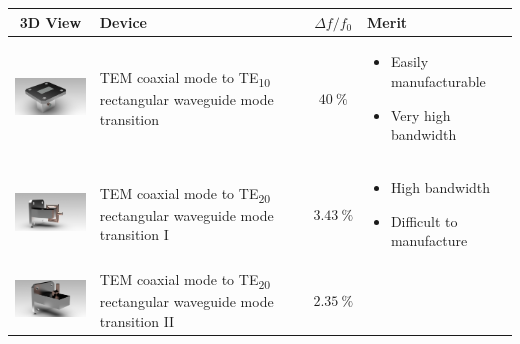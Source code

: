 \documentclass[english,twoside]{article}
\newcommand\pro{\item[$+$]}
\newcommand\con{\item[$-$]}
\begin{document}
			
		\begin{landscape}
			\begin{table}[H]
				\centering
				{\small
					\begin{tabular}{c|l|c|l}
						3D View & Device & $\Delta f / f_0$ & Merit\\
						\hline
						\includegraphics[width=3.5cm,valign=c,margin=3pt]{renders/coaxToWaveguide} & \begin{minipage}{7cm}TEM coaxial mode to TE\textsubscript{10} rectangular waveguide mode transition\end{minipage} & $\SI{40}{\percent}$ &
						\begin{minipage}{5cm} 
							\begin{itemize}
								\pro Easily manufacturable
								\pro Very high bandwidth
							\end{itemize}
						\end{minipage}\\
						\hline
						\includegraphics[width=3.4cm,valign=c,margin=3pt]{renders/coaxToWrTE20_screw-3} & \begin{minipage}{7cm}TEM coaxial mode to TE\textsubscript{20} rectangular waveguide mode transition I\end{minipage} & $\SI{3.43}{\percent}$ &
						\begin{minipage}{5cm} 
							\begin{itemize}
								\pro High bandwidth
								\con Difficult to manufacture
							\end{itemize}
						\end{minipage}\\
						\hline
						\includegraphics[width=3.5cm,valign=c,margin=3pt]{renders/coaxToWrTE20_alternative-2} & \begin{minipage}{7cm}TEM coaxial mode to TE\textsubscript{20} rectangular waveguide mode transition II\end{minipage} &$\SI{2.35}{\percent}$ &

\end{tabular}}
\end{table}
\end{landscape}
\end{document}
